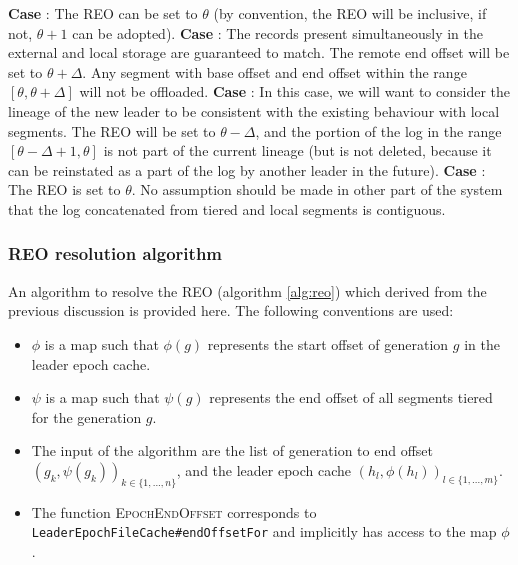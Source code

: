 \documentclass{article}
\newcommand*\circled[1]{\tikz[baseline=(char.base)]{
		\node[shape=circle,draw,inner sep=1pt] (char) {#1};}}
\begin{document}
\begin{outline}[enumerate]
	\1 \textbf{Case \circled{A}}: The REO can be set to $\theta$ (by convention, the REO will be inclusive, if not, $\theta +1$ can be adopted).
	\1 \textbf{Case \circled{B}}: The records present simultaneously in the external and local storage are guaranteed to match. The remote end offset will be set to $\theta+\Delta$. Any segment with base offset and end offset within the range $[\theta, \theta+\Delta]$ will not be offloaded.
	\1 \textbf{Case \circled{C}}: In this case, we will want to consider the lineage of the new leader to be consistent with the existing behaviour with local segments. The REO will be set to $\theta - \Delta$, and the portion of the log in the range $[\theta - \Delta + 1, \theta]$ is not part of the current lineage (but is not deleted, because it can be reinstated as a part of the log by another leader in the future).
	\1 \textbf{Case \circled{D}}: The REO is set to $\theta$. No assumption should be made in other part of the system that the log concatenated from tiered and local segments is contiguous.
\end{outline}

\subsubsection{REO resolution algorithm}

An algorithm to resolve the REO (algorithm \ref{alg:reo}) which derived from the previous discussion is provided here. The following conventions are used:

\begin{itemize}
	\item $\phi$ is a map such that $\phi(g)$ represents the start offset of generation $g$ in the leader epoch cache.
	\item $\psi$ is a map such that $\psi(g)$ represents the end offset of all segments tiered for the generation $g$.
	\item The input of the algorithm are the list of generation to end offset $(g_k, \psi(g_k))_{k \in \{1,...,n\}}$, and the leader epoch cache $(h_l, \phi(h_l))_{l \in \{1,...,m\}}$.
	\item The function \textsc{EpochEndOffset} corresponds to \texttt{LeaderEpochFileCache\#endOffsetFor} and implicitly has access to the map $\phi$.
\end{itemize} 
\end{document}

